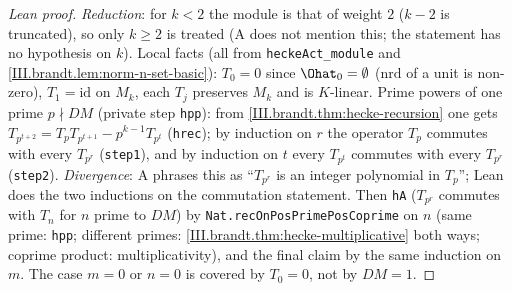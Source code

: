 \begin{proof}[Lean proof]
\emph{Reduction}: for $k<2$ the module is that of weight $2$ ($k-2$ is truncated), so only $k\ge2$ is treated (A does not mention this; the statement has no hypothesis on $k$). Local facts (all from \texttt{heckeAct\_module} and \cref{III.brandt.lem:norm-n-set-basic}): $T_0=0$ since $\Ohat_0=\emptyset$ ($\mathrm{nrd}$ of a unit is non-zero), $T_1=\mathrm{id}$ on $M_k$, each $T_j$ preserves $M_k$ and is $K$-linear. Prime powers of one prime $p\nmid DM$ (private step \texttt{hpp}): from \cref{III.brandt.thm:hecke-recursion} one gets $T_{p^{t+2}}=T_pT_{p^{t+1}}-p^{k-1}T_{p^t}$ (\texttt{hrec}); by induction on $r$ the operator $T_p$ commutes with every $T_{p^r}$ (\texttt{step1}), and by induction on $t$ every $T_{p^t}$ commutes with every $T_{p^r}$ (\texttt{step2}). \emph{Divergence}: A phrases this as ``$T_{p^r}$ is an integer polynomial in $T_p$''; Lean does the two inductions on the commutation statement. Then \texttt{hA} ($T_{p^r}$ commutes with $T_n$ for $n$ prime to $DM$) by \texttt{Nat.recOnPosPrimePosCoprime} on $n$ (same prime: \texttt{hpp}; different primes: \cref{III.brandt.thm:hecke-multiplicative} both ways; coprime product: multiplicativity), and the final claim by the same induction on $m$. The case $m=0$ or $n=0$ is covered by $T_0=0$, not by $DM=1$.
\end{proof}


